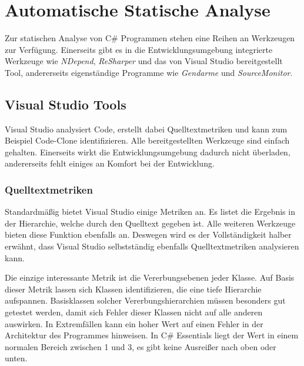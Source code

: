 %
\section{Automatische Statische Analyse}
Zur statischen Analyse von C\# Programmen stehen eine Reihen an Werkzeugen zur Verfügung. Einerseits gibt es in die Entwicklungsumgebung integrierte Werkzeuge wie \emph{NDepend}, \emph{ReSharper} und das von Visual Studio bereitgestellt Tool, andererseits eigenständige Programme wie \emph{Gendarme} und \emph{SourceMonitor}.

\subsection{Visual Studio Tools}
Visual Studio analysiert Code, erstellt dabei Quelltextmetriken und kann zum Beispiel Code-Clone identifizieren. Alle bereitgestellten Werkzeuge sind einfach gehalten. Einerseits wirkt die Entwicklungsumgebung dadurch nicht überladen, andererseits fehlt einiges an Komfort bei der Entwicklung.

\subsubsection{Quelltextmetriken}
Standardmäßig bietet Visual Studio einige Metriken an. Es listet die Ergebnis in der Hierarchie, welche durch den Quelltext gegeben ist. Alle weiteren Werkzeuge bieten diese Funktion ebenfalls an. Deswegen wird es der Vollständigkeit halber erwähnt, dass Visual Studio selbstständig ebenfalls Quelltextmetriken analysieren kann.

Die einzige interessante Metrik ist die Vererbungsebenen jeder Klasse. Auf Basis dieser Metrik lassen sich Klassen identifizieren, die eine tiefe Hierarchie aufspannen. Basisklassen solcher Vererbungshierarchien müssen besonders gut getestet werden, damit sich Fehler dieser Klassen nicht auf alle anderen auswirken. In Extremfällen kann ein hoher Wert auf einen Fehler in der Architektur des Programmes hinweisen. In C\# Essentials liegt der Wert in einem normalen Bereich zwischen 1 und 3, es gibt keine Ausreißer nach oben oder unten.

